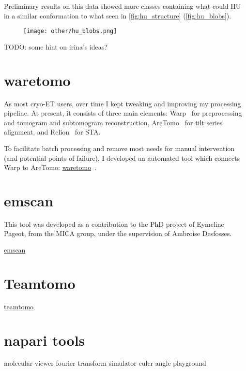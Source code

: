 Preliminary results on this data showed more classes containing what could HU in a similar conformation to what seen in \autoref{fig:hu_structure} (\autoref{fig:hu_blobs}).

\begin{figure}[ht]
    \centering
    \texttt{[image: other/hu\_blobs.png]}
    \label{fig:hu_blobs}
\end{figure}

TODO: some hint on irina's ideas?

\section{waretomo}

As most cryo-ET users, over time I kept tweaking and improving my processing pipeline.
At present, it consists of three main elements: Warp~\cite{tegunovRealtimeCryoelectronMicroscopy2019} for preprocessing and tomogram and subtomogram reconstruction, AreTomo~\cite{zhengAreTomoIntegratedSoftware2022} for tilt series alignment, and Relion~\cite{scheresRELIONImplementationBayesian2012,zivanovBayesianApproachSingleparticle2022,burtImageProcessingPipeline2024} for STA.

To facilitate batch processing and remove most needs for manual intervention (and potential points of failure), I developed an automated tool which connects Warp to AreTomo: \href{https://gihub.com/brisvag/waretomo}{waretomo}~\cite{gaifasWaretomoV02024}.

\section{emscan}

This tool was developed as a contribution to the PhD project of Eymeline Pageot, from the MICA group, under the supervision of Ambroise Desfosses.

\href{https://gihub.com/brisvag/emscan}{emscan}

\section{Teamtomo}

\href{https://teamtomo.org}{teamtomo}
\section{napari tools}
molecular viewer
fourier transform simulator
euler angle playground

